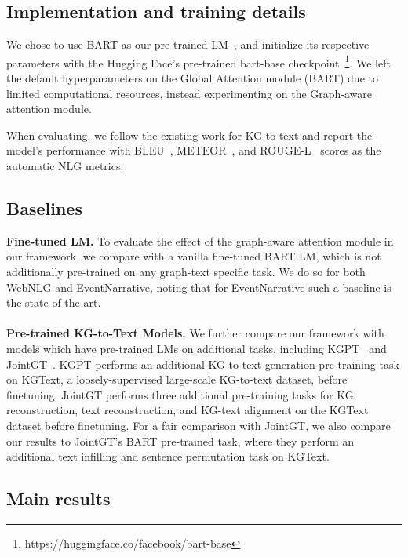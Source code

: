 \documentclass[11pt]{article}
\begin{document}
\subsection{Implementation and training details}
We chose to use BART as our pre-trained LM~\cite{lewis2020bart}, and initialize its respective parameters with the Hugging Face's pre-trained bart-base checkpoint~\footnote{https://huggingface.co/facebook/bart-base}. We left the default hyperparameters on the Global Attention module (BART) due to limited computational resources, instead experimenting on the Graph-aware attention module. 

When evaluating, we follow the existing work for KG-to-text and report the model's performance with BLEU~\cite{papineni2002bleu}, METEOR~\cite{banerjee2005meteor}, and ROUGE-L~\cite{lin2004rouge} scores as the automatic NLG metrics.

\subsection{Baselines}
\textbf{Fine-tuned LM.}
To evaluate the effect of the graph-aware attention module in our framework, we compare with a vanilla fine-tuned BART LM, which is not additionally pre-trained on any graph-text specific task. We do so for both WebNLG and EventNarrative, noting that for EventNarrative such a baseline is the state-of-the-art.
\\\\
\noindent\textbf{Pre-trained KG-to-Text Models.} We further compare our framework with models which have pre-trained LMs on additional tasks, including KGPT~\cite{chen-etal-2020-kgpt} and JointGT~\cite{ke-etal-2021-jointgt}. KGPT performs an additional KG-to-text generation pre-training task on KGText, a loosely-supervised large-scale KG-to-text dataset, before finetuning. JointGT performs three additional pre-training tasks for KG reconstruction, text reconstruction, and KG-text alignment on the KGText dataset before finetuning. For a fair comparison with JointGT, we also compare our results to JointGT's BART pre-trained task, where they perform an additional text infilling and sentence permutation task on KGText.


\subsection{Main results}
\end{document}
